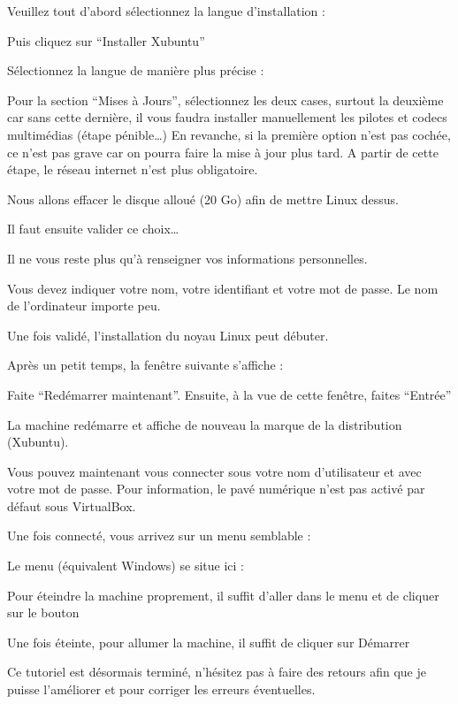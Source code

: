 Veuillez tout d’abord sélectionnez la langue d’installation : 


Puis cliquez sur “Installer Xubuntu”








Sélectionnez la langue de manière plus précise :



Pour la section “Mises à Jours”, sélectionnez les deux cases, surtout la deuxième car sans cette dernière, il vous faudra installer manuellement les pilotes et codecs multimédias (étape pénible…)
En revanche, si la première option n’est pas cochée, ce n’est pas grave car on pourra faire la mise à jour plus tard.
A partir de cette étape, le réseau internet n’est plus obligatoire.



Nous allons effacer le disque alloué (20 Go) afin de mettre Linux dessus.

Il faut ensuite valider ce choix…

Il ne vous reste plus qu'à renseigner vos informations personnelles.


Vous devez indiquer votre nom, votre identifiant et votre mot de passe.
Le nom de l’ordinateur importe peu.


Une fois validé, l’installation du noyau Linux peut débuter.


Après un petit temps, la fenêtre suivante s’affiche :

Faite “Redémarrer maintenant”.
Ensuite, à la vue de cette fenêtre, faites “Entrée”

La machine redémarre et affiche de nouveau la marque de la distribution (Xubuntu).

Vous pouvez maintenant vous connecter sous votre nom d’utilisateur
et avec votre mot de passe. Pour information, le pavé numérique n’est pas activé par défaut sous VirtualBox.


Une fois connecté, vous arrivez sur un menu semblable :


Le menu (équivalent Windows) se situe ici :



Pour éteindre la machine proprement, il suffit d’aller dans le menu et de cliquer sur le bouton 

Une fois éteinte, pour allumer la machine, il suffit de cliquer sur Démarrer



Ce tutoriel est désormais terminé, n’hésitez pas à faire des retours afin que je puisse l’améliorer et pour corriger les erreurs éventuelles.
